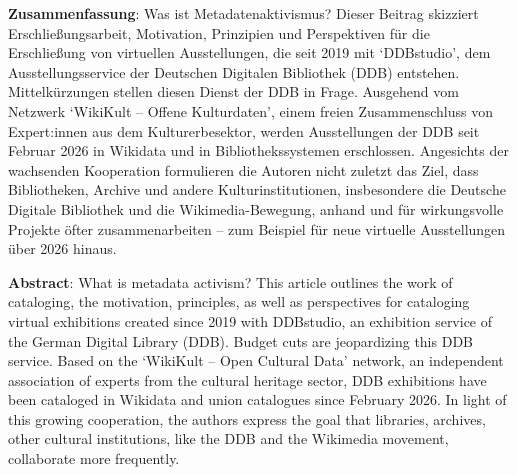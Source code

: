 \textbf{Zusammenfassung}: Was ist Metadatenaktivismus? Dieser Beitrag
skizziert Erschließungsarbeit, Motivation, Prinzipien und Perspektiven
für die Erschließung von virtuellen Ausstellungen, die seit 2019 mit
`DDBstudio', dem Ausstellungsservice der Deutschen Digitalen Bibliothek
(DDB) entstehen. Mittelkürzungen stellen diesen Dienst der DDB in Frage.
Ausgehend vom Netzwerk `WikiKult -- Offene Kulturdaten', einem freien
Zusammenschluss von Expert:innen aus dem Kulturerbesektor, werden
Ausstellungen der DDB seit Februar 2026 in Wikidata und in
Bibliothekssystemen erschlossen. Angesichts der wachsenden Kooperation
formulieren die Autoren nicht zuletzt das Ziel, dass Bibliotheken,
Archive und andere Kulturinstitutionen, insbesondere die Deutsche
Digitale Bibliothek und die Wikimedia-Bewegung, anhand und für
wirkungsvolle Projekte öfter zusammenarbeiten -- zum Beispiel für neue
virtuelle Ausstellungen über 2026 hinaus.

\textbf{Abstract}: What is metadata activism? This article outlines the
work of cataloging, the motivation, principles, as well as perspectives
for cataloging virtual exhibitions created since 2019 with DDBstudio, an
exhibition service of the German Digital Library (DDB). Budget cuts are
jeopardizing this DDB service. Based on the `WikiKult -- Open Cultural
Data' network, an independent association of experts from the cultural
heritage sector, DDB exhibitions have been cataloged in Wikidata and
union catalogues since February 2026. In light of this growing
cooperation, the authors express the goal that libraries, archives,
other cultural institutions, like the DDB and the Wikimedia movement,
collaborate more frequently.
